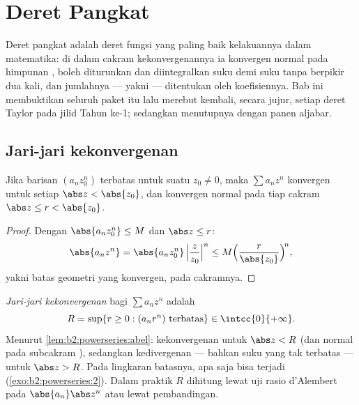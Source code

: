 \chapter{Deret Pangkat}\label{ch:b2:powerseries}

Deret pangkat adalah deret fungsi yang paling baik kelakuannya dalam
matematika: di dalam cakram kekonvergenannya ia konvergen
normal pada himpunan , boleh diturunkan dan diintegralkan suku
demi suku tanpa berpikir dua kali, dan jumlahnya --- yakni \emph{} --- ditentukan oleh koefisiennya. Bab ini
membuktikan seluruh paket itu lalu merebut kembali, secara jujur, setiap
deret Taylor pada jilid Tahun ke-1; sedangkan 
menutupnya dengan panen aljabar.

\section{Jari-jari kekonvergenan}

\begin{lemma}[Abel]\label{lem:b2:powerseries:abel}
Jika barisan $(a_n z_0^n)$ terbatas untuk suatu $z_0 \neq 0$,
maka $\sum a_n z^n$ konvergen  untuk setiap $\abs z < \abs
{z_0}$, dan konvergen normal pada tiap cakram $\abs z \leq r < \abs{z_0}$.
\end{lemma}

\begin{proof}
Dengan $\abs{a_n z_0^n} \leq M$ dan $\abs z \leq r$:
\[
\abs{a_n z^n} = \abs{a_n z_0^n}\,\Bigl|\frac{z}{z_0}\Bigr|^n
\leq M\Bigl(\frac{r}{\abs{z_0}}\Bigr)^{\!n},
\]
yakni batas geometri yang konvergen,  pada cakramnya.
\end{proof}

\begin{definition}\label{def:b2:powerseries:radius}
\emph{Jari-jari kekonvergenan} bagi
$\sum a_n z^n$ adalah
\[
R = \sup\{r \geq 0 : (a_n r^n) \text{ terbatas}\} \in
\intcc{0}{+\infty} .
\]
Menurut \cref{lem:b2:powerseries:abel}: kekonvergenan  untuk
$\abs z < R$ (dan normal pada subcakram ), sedangkan kedivergenan
--- bahkan suku yang tak terbatas --- untuk $\abs z > R$. Pada lingkaran
batasnya, apa saja bisa terjadi (\cref{exo:b2:powerseries:2}). Dalam
praktik $R$ dihitung lewat uji rasio d'Alembert pada $\abs{a_n}\abs z^n$
atau lewat pembandingan.
\end{definition}

